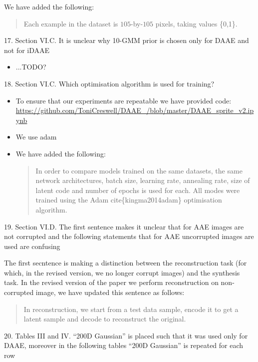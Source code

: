 \documentclass{article}
\begin{document}
We have added the following: 
\begin{quote}
     Each example in the dataset is $105$-by-$105$ pixels, taking values \{0,1\}. 
\end{quote}

{\color{blue}
17. Section VI.C. It is unclear why 10-GMM prior is chosen only for DAAE and not for iDAAE} \newline

\begin{itemize}
    \item ...TODO? 
\end{itemize}

{\color{blue}
18. Section VI.C. Which optimisation algorithm is used for training?}
\begin{itemize}
    \item To ensure that our experiments are repeatable we have provided code: \url{https://github.com/ToniCreswell/DAAE_/blob/master/DAAE_sprite_v2.ipynb}
    \item We use adam
    \item We have added the following:
    \begin{quote}
        In order to compare models trained on the same datasets, the same network architectures, batch size, learning rate, annealing rate, size of latent code and number of epochs is used for each. All modes were trained using the Adam cite\{kingma2014adam\} optimisation algorithm.
    \end{quote}
\end{itemize}

{\color{blue}
19. Section VI.D. The first sentence makes it unclear that for AAE images are not corrupted and the following statements that for AAE uncorrupted images are used are confusing
}

{\color{red}
The first secntence is making a distinction between the reconstruction task (for which, in the revised version, we no longer corrupt images) and the synthesis task. In the revised version of the paper we perform reconstruction on non-corrupted image, we have updated this sentence as follows:

\begin{quote}
In reconstruction, we start from a test data sample, encode it to get a latent sample and decode to reconstruct the original. 
\end{quote}
}

{\color{blue}
20. Tables III and IV. ``200D Gaussian'' is placed such that it was used only for DAAE, moreover in the following tables ``200D Gaussian'' is repeated for each row
}
\end{document}
